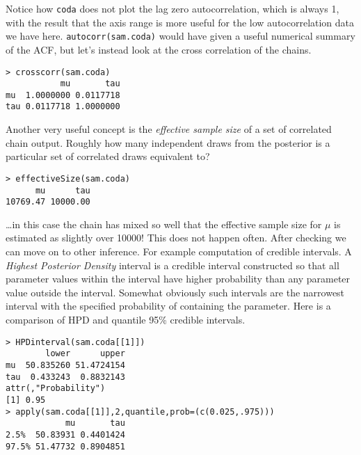 \documentclass[10pt] {article}
\newcommand{\eps}[3]
{{\begin{center}
 \rotatebox{#1}{\scalebox{#2}{\texttt{[image: \#3]}}}
 \end{center}}
}
\theoremstyle{definition}
\begin{document}
\vspace*{-1cm}

\eps{-90}{.4}{coda-acf.eps}

\noindent Notice how {\tt coda} does not plot the lag zero autocorrelation, which is always 1, with the result that the axis range is more useful for the low autocorrelation data we have here. \lstinline+autocorr(sam.coda)+ would have given a useful numerical summary of the ACF, but let's instead look at the cross correlation of the chains.
\begin{lstlisting}
> crosscorr(sam.coda)
           mu       tau
mu  1.0000000 0.0117718
tau 0.0117718 1.0000000
\end{lstlisting}
Another very useful concept is the {\em effective sample size} of a set of correlated chain output. Roughly how many independent draws from the posterior is a particular set of correlated draws equivalent to?
\begin{lstlisting}
> effectiveSize(sam.coda)
      mu      tau 
10769.47 10000.00
\end{lstlisting}
\ldots in this case the chain has mixed so well that the effective sample size for $\mu$ is estimated as slightly over 10000! This does not happen often. After checking we can move on to other inference. For example computation of credible intervals. A {\em Highest Posterior Density} interval is a credible interval constructed so that all parameter values within the interval have higher probability than any parameter value outside the interval. Somewhat obviously such intervals are the narrowest interval with the specified probability of containing the parameter. Here is a comparison of HPD and quantile 95\% credible intervals.  
\begin{lstlisting}
> HPDinterval(sam.coda[[1]])
        lower      upper
mu  50.835260 51.4724154
tau  0.433243  0.8832143
attr(,"Probability")
[1] 0.95
> apply(sam.coda[[1]],2,quantile,prob=(c(0.025,.975)))
            mu       tau
2.5%  50.83931 0.4401424
97.5% 51.47732 0.8904851
\end{lstlisting}
\end{document}
